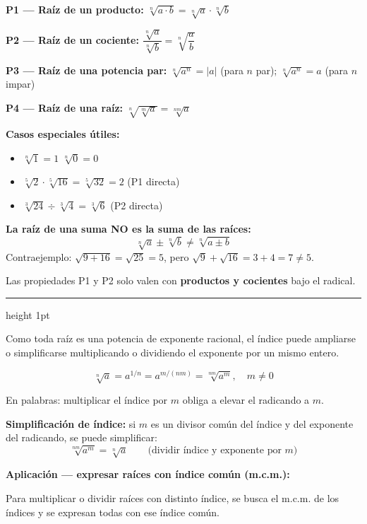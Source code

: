 \documentclass[11pt, letterpaper]{article}
\newcommand{\subbloque}[1]{%
  \vspace{8pt}
  \noindent{\large\bfseries\color{zenitnavy} #1}\par
  \vspace{3pt}
  \hrule height 1pt
  \vspace{6pt}
}
\begin{document}
\begin{tcolorbox}[importantbox, title={Propiedades de las raíces — con $a,b\geq 0$, $b\neq 0$ si es denominador}]

\textbf{P1 — Raíz de un producto:} $\sqrt[n]{a\cdot b}=\sqrt[n]{a}\cdot\sqrt[n]{b}$

\textbf{P2 — Raíz de un cociente:} $\dfrac{\sqrt[n]{a}}{\sqrt[n]{b}}=\sqrt[n]{\dfrac{a}{b}}$

\textbf{P3 — Raíz de una potencia par:} $\sqrt[n]{a^n}=|a|$ (para $n$ par); \quad $\sqrt[n]{a^n}=a$ (para $n$ impar)

\textbf{P4 — Raíz de una raíz:} $\sqrt[n]{\sqrt[m]{a}}=\sqrt[nm]{a}$

\medskip
\textbf{Casos especiales útiles:}
\begin{itemize}
  \item $\sqrt[n]{1}=1$ \qquad $\sqrt[n]{0}=0$
  \item $\sqrt[5]{2}\cdot\sqrt[5]{16}=\sqrt[5]{32}=2$ \qquad (P1 directa)
  \item $\sqrt[3]{24}\div\sqrt[3]{4}=\sqrt[3]{6}$ \qquad (P2 directa)
\end{itemize}
\end{tcolorbox}

\begin{tcolorbox}[warningbox, title={Error frecuente}]
\textbf{La raíz de una suma NO es la suma de las raíces:}
$$\sqrt[n]{a}\pm\sqrt[n]{b} \neq \sqrt[n]{a\pm b}$$
Contraejemplo: $\sqrt{9+16}=\sqrt{25}=5$, pero $\sqrt{9}+\sqrt{16}=3+4=7\neq 5$.

Las propiedades P1 y P2 solo valen con \textbf{productos y cocientes} bajo el radical.
\end{tcolorbox}

\subbloque{3.2 Cambio de índice de una raíz}

Como toda raíz es una potencia de exponente racional, el índice puede ampliarse o simplificarse multiplicando o dividiendo el exponente por un mismo entero.

\begin{tcolorbox}[importantbox, title={Cambio de índice}]
$$\sqrt[n]{a}=a^{1/n}=a^{m/(nm)}=\sqrt[nm]{a^m}, \quad m\neq 0$$

En palabras: multiplicar el índice por $m$ obliga a elevar el radicando a $m$.

\medskip
\textbf{Simplificación de índice:} si $m$ es un divisor común del índice y del exponente del radicando, se puede simplificar:
$$\sqrt[nm]{a^m}=\sqrt[n]{a} \qquad \text{(dividir índice y exponente por } m\text{)}$$

\textbf{Aplicación — expresar raíces con índice común (m.c.m.):}

Para multiplicar o dividir raíces con distinto índice, se busca el m.c.m. de los índices y se expresan todas con ese índice común.
\end{tcolorbox}
\end{document}
